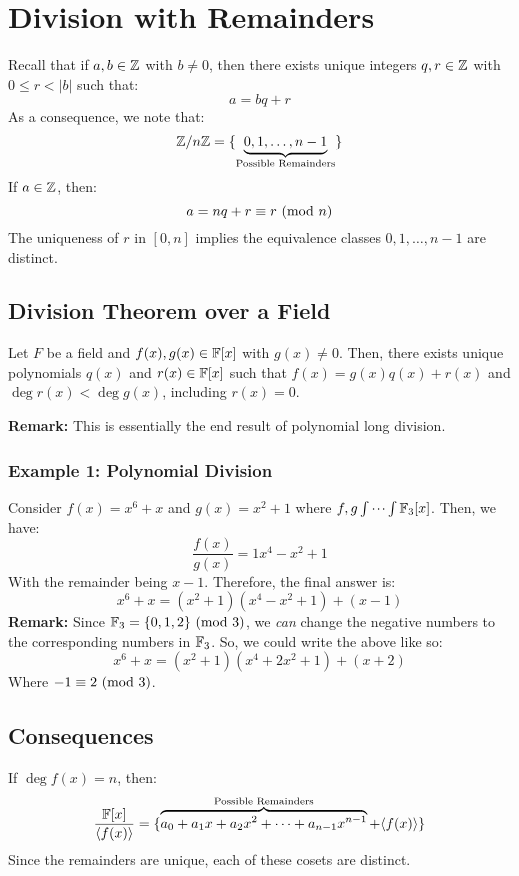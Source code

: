 \documentclass[letterpaper]{article}
\begin{document}
\section{Division with Remainders}
Recall that if $a, b \in \mathbb{Z}$ with $b \neq 0$, then there exists unique integers $q, r \in \mathbb{Z}$ with $0 \leq r < |b|$ such that:
\[a = bq + r\]
As a consequence, we note that: 
\[\mathbb{Z} / n \mathbb{Z} = \{\underbrace{0, 1, \dots, n - 1}_{\text{Possible Remainders}}\}\]
If $a \in \mathbb{Z}$, then:
\[a = nq + r \equiv r \ (\mathrm{mod}\ n)\]
The uniqueness of $r$ in $[0, n]$ implies the equivalence classes $0, 1, \dots, n - 1$ are distinct. 

\subsection{Division Theorem over a Field}
\begin{theorem}{}{}
    Let $F$ be a field and $f(x), g(x) \in \mathbb{F}[x]$ with $g(x) \neq 0$. Then, there exists unique polynomials $q(x)$ and $r(x) \in \mathbb{F}[x]$ such that $f(x) = g(x) q(x) + r(x)$ and $\deg r(x) < \deg g(x)$, including $r(x) = 0$. 
\end{theorem}
\textbf{Remark:} This is essentially the end result of polynomial long division. 

\subsubsection{Example 1: Polynomial Division}
Consider $f(x) = x^6 + x$ and $g(x) = x^2 + 1$ where $f, g \idotsint \mathbb{F}_{3}[x]$. Then, we have: 
\[\frac{f(x)}{g(x)} = 1x^4 - x^2 + 1\]
With the remainder being $x - 1$. Therefore, the final answer is: 
\[x^6 + x = (x^2 + 1)(x^4 - x^2 + 1) + (x - 1)\]
\textbf{Remark:} Since $\mathbb{F}_{3} = \{0, 1, 2\} \ (\mathrm{mod}\ 3)$, we \emph{can} change the negative numbers to the corresponding numbers in $\mathbb{F}_{3}$. So, we could write the above like so: 
\[x^6 + x = (x^2 + 1)(x^4 + 2x^2 + 1) + (x + 2)\]
Where $-1 \equiv 2 \ (\mathrm{mod}\ 3)$. 

\subsection{Consequences}
If $\deg f(x) = n$, then: 
\[\frac{\mathbb{F}[x]}{\langle f(x) \rangle} = \{\overbrace{a_0 + a_1 x + a_2 x^2 + \dots + a_{n - 1} x^{n - 1}}^{\text{Possible Remainders}} + \langle f(x) \rangle\}\]
Since the remainders are unique, each of these cosets are distinct. 
\end{document}
